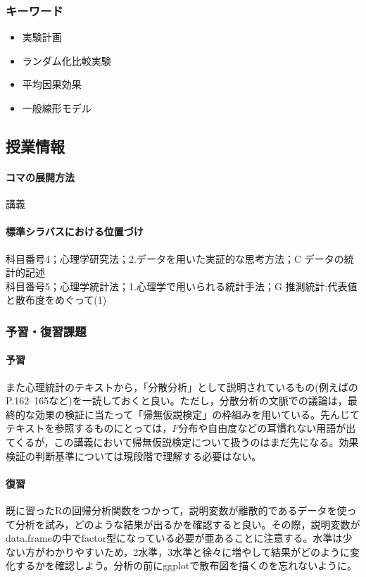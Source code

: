 \subsubsection{キーワード}
\begin{itemize}
\item 実験計画
\item ランダム化比較実験
\item 平均因果効果
\item 一般線形モデル
\end{itemize}
\subsection{授業情報}
\paragraph{コマの展開方法}
講義
\paragraph{標準シラバスにおける位置づけ}
科目番号4；心理学研究法；2.データを用いた実証的な思考方法；C データの統計的記述\\
科目番号5；心理学統計法；1.心理学で用いられる統計手法；G 推測統計:代表値と散布度をめぐって(1)
\subsubsection{予習・復習課題}
\paragraph{予習}
また心理統計のテキストから，「分散分析」として説明されているもの(例えば\citet{Yamada2004}のP.162--165など)を一読しておくと良い。ただし，分散分析の文脈での議論は，最終的な効果の検証に当たって「帰無仮説検定」の枠組みを用いている。先んじてテキストを参照するものにとっては，$F分布$や自由度などの耳慣れない用語が出てくるが，この講義において帰無仮説検定について扱うのはまだ先になる。効果検証の判断基準については現段階で理解する必要はない。
\paragraph{復習}
既に習ったRの回帰分析関数をつかって，説明変数が離散的であるデータを使って分析を試み，どのような結果が出るかを確認すると良い。その際，説明変数がdata.frameの中でfactor型になっている必要が亜あることに注意する。水準は少ない方がわかりやすいため，2水準，3水準と徐々に増やして結果がどのように変化するかを確認しよう。分析の前にggplotで散布図を描くのを忘れないように。
